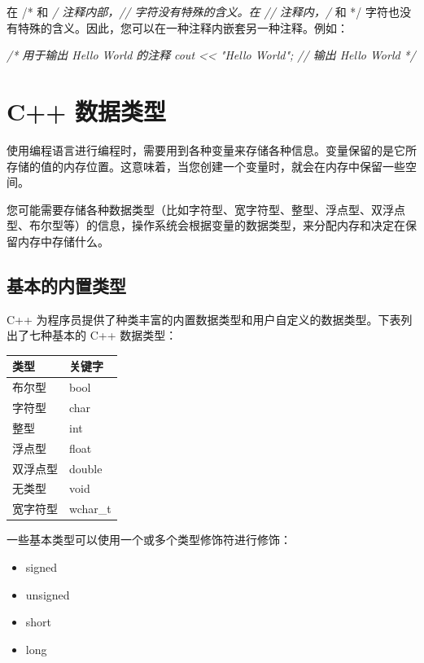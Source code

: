\documentclass[
]{article}
\newenvironment{Shaded}{}{}
\newcommand{\CommentTok}[1]{\textcolor[rgb]{0.38,0.63,0.69}{\textit{#1}}}
\providecommand{\tightlist}{%
  \setlength{\itemsep}{0pt}\setlength{\parskip}{0pt}}
\begin{document}
在 /* 和 \emph{/ 注释内部，// 字符没有特殊的含义。在 // 注释内，/} 和 */
字符也没有特殊的含义。因此，您可以在一种注释内嵌套另一种注释。例如：

\begin{Shaded}
\begin{Highlighting}[]
\CommentTok{/* 用于输出 Hello World 的注释}
\CommentTok{cout \textless{}\textless{} "Hello World"; // 输出 Hello World}
\CommentTok{*/}
\end{Highlighting}
\end{Shaded}

\hypertarget{c-ux6570ux636eux7c7bux578b}{%
\section{C++ 数据类型}\label{c-ux6570ux636eux7c7bux578b}}

使用编程语言进行编程时，需要用到各种变量来存储各种信息。变量保留的是它所存储的值的内存位置。这意味着，当您创建一个变量时，就会在内存中保留一些空间。

您可能需要存储各种数据类型（比如字符型、宽字符型、整型、浮点型、双浮点型、布尔型等）的信息，操作系统会根据变量的数据类型，来分配内存和决定在保留内存中存储什么。

\hypertarget{ux57faux672cux7684ux5185ux7f6eux7c7bux578b}{%
\subsection{基本的内置类型}\label{ux57faux672cux7684ux5185ux7f6eux7c7bux578b}}

C++
为程序员提供了种类丰富的内置数据类型和用户自定义的数据类型。下表列出了七种基本的
C++ 数据类型：

\begin{longtable}[]{@{}ll@{}}
\toprule
类型 & 关键字 \\
\midrule
\endhead
布尔型 & bool \\
字符型 & char \\
整型 & int \\
浮点型 & float \\
双浮点型 & double \\
无类型 & void \\
宽字符型 & wchar\_t \\
\bottomrule
\end{longtable}

一些基本类型可以使用一个或多个类型修饰符进行修饰：

\begin{itemize}
\tightlist
\item
  signed
\item
  unsigned
\item
  short
\item
  long
\end{itemize}
\end{document}
